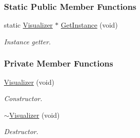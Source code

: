\subsubsection*{Static Public Member Functions}
\begin{DoxyCompactItemize}
\item 
static \hyperlink{group___core_class_visualizer}{Visualizer} $\ast$ \hyperlink{group___core_a8c905f72fdc7db2ecd53ffe473340bf7}{Get\-Instance} (void)
\begin{DoxyCompactList}\small\item\em Instance getter. \end{DoxyCompactList}\end{DoxyCompactItemize}
\subsubsection*{Private Member Functions}
\begin{DoxyCompactItemize}
\item 
\hyperlink{group___core_a3611c9e093d8d855f72bcad4757ce188}{Visualizer} (void)
\begin{DoxyCompactList}\small\item\em Constructor. \end{DoxyCompactList}\item 
\hyperlink{group___core_a28c30d39ef9921a98d5b714ef1256186}{$\sim$\-Visualizer} (void)
\begin{DoxyCompactList}\small\item\em Destructor. \end{DoxyCompactList}\end{DoxyCompactItemize}
